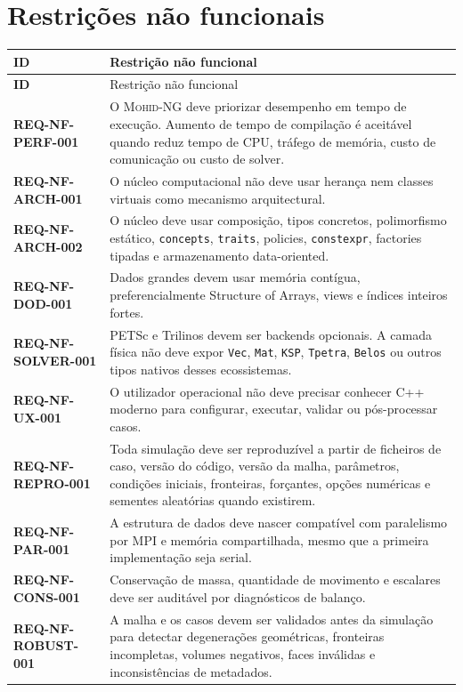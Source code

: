 \documentclass[11pt,a4paper]{article}
\newcommand{\req}[1]{\textsf{\textbf{#1}}}
\newcommand{\mohidng}{\textsc{Mohid-NG}}
\begin{document}
\section{Restrições não funcionais}

\begin{longtable}{>{\sffamily\bfseries}p{}p{}}
\toprule
ID & Restrição não funcional \\
\midrule
\endfirsthead
\toprule
ID & Restrição não funcional \\
\midrule
\endhead
\req{REQ-NF-PERF-001} & O \mohidng{} deve priorizar desempenho em tempo de execução. Aumento de tempo de compilação é aceitável quando reduz tempo de CPU, tráfego de memória, custo de comunicação ou custo de solver. \\
\req{REQ-NF-ARCH-001} & O núcleo computacional não deve usar herança nem classes virtuais como mecanismo arquitectural. \\
\req{REQ-NF-ARCH-002} & O núcleo deve usar composição, tipos concretos, polimorfismo estático, \texttt{concepts}, \texttt{traits}, policies, \texttt{constexpr}, factories tipadas e armazenamento data-oriented. \\
\req{REQ-NF-DOD-001} & Dados grandes devem usar memória contígua, preferencialmente Structure of Arrays, views e índices inteiros fortes. \\
\req{REQ-NF-SOLVER-001} & PETSc e Trilinos devem ser backends opcionais. A camada física não deve expor \texttt{Vec}, \texttt{Mat}, \texttt{KSP}, \texttt{Tpetra}, \texttt{Belos} ou outros tipos nativos desses ecossistemas. \\
\req{REQ-NF-UX-001} & O utilizador operacional não deve precisar conhecer C++ moderno para configurar, executar, validar ou pós-processar casos. \\
\req{REQ-NF-REPRO-001} & Toda simulação deve ser reproduzível a partir de ficheiros de caso, versão do código, versão da malha, parâmetros, condições iniciais, fronteiras, forçantes, opções numéricas e sementes aleatórias quando existirem. \\
\req{REQ-NF-PAR-001} & A estrutura de dados deve nascer compatível com paralelismo por MPI e memória compartilhada, mesmo que a primeira implementação seja serial. \\
\req{REQ-NF-CONS-001} & Conservação de massa, quantidade de movimento e escalares deve ser auditável por diagnósticos de balanço. \\
\req{REQ-NF-ROBUST-001} & A malha e os casos devem ser validados antes da simulação para detectar degenerações geométricas, fronteiras incompletas, volumes negativos, faces inválidas e inconsistências de metadados. \\
\bottomrule
\end{longtable}
\end{document}
